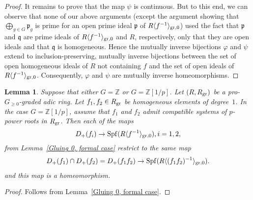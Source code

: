 \documentclass[12pt,twoside,a4paper]{article}
\newtheorem{lemma}[thm]{Lemma}
\theoremstyle{definition}
\theoremstyle{remark}
\newcommand\gr{{\rm gr}}
\newcommand\Spf{{\rm Spf}}
\begin{document}
\begin{proof}
It remains to prove that the map $\psi$ is continuous. But to this end, we can observe that none of our above arguments (except the argument showing that $\bigoplus_{g\in G}\mathfrak{p}_{g}$ is prime for an open prime ideal $\mathfrak{p}$ of $R\langle f^{-1}\rangle_{\gr,0}$) used the fact that $\mathfrak{p}$ and $\mathfrak{q}$ are prime ideals of $R\langle f^{-1}\rangle_{\gr,0}$ and $R$, respectively, only that they are open ideals and that $\mathfrak{q}$ is homogeneous. Hence the mutually inverse bijections $\varphi$ and $\psi$ extend to inclusion-preserving, mutually inverse bijections between the set of open homogeneous ideals of $R$ not containing $f$ and the set of open ideals of $R\langle f^{-1}\rangle_{\gr,0}$. Consequently, $\varphi$ and $\psi$ are mutually inverse homeomorphisms. \end{proof}
\begin{lemma}\label{Gluing 1, formal case}Suppose that either $G=\mathbb{Z}$ or $G=\mathbb{Z}[1/p]$. Let $(R, R_{\gr})$ be a pro-$G_{\geq0}$-graded adic ring. Let $f_1, f_2\in R_{\gr}$ be homogeneous elements of degree~$1$. In the case $G=\mathbb{Z}[1/p]$, assume that $f_{1}$ and $f_{2}$ admit compatible systems of $p$-power roots in $R_{\gr}$. Then each of the maps \begin{equation*}D_{+}(f_{i})\to \Spf(R\langle f^{-1}\rangle_{\gr, 0}), i=1, 2,\end{equation*}from Lemma~\ref{Gluing 0, formal case} restrict to the same map \begin{equation*}D_{+}(f_{1})\cap D_{+}(f_{2})=D_{+}(f_{1}f_{2})\to \Spf(R\langle (f_{1}f_{2})^{-1}\rangle_{\gr, 0}).\end{equation*}and this map is a homeomorphism.\end{lemma}
\begin{proof}Follows from Lemma~\ref{Gluing 0, formal case}.\end{proof}
\end{document}
